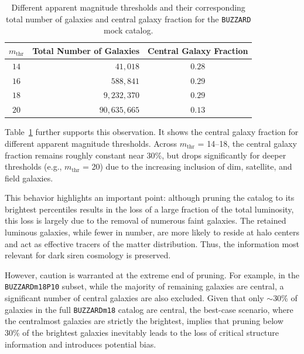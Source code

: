 \begin{table}
    \small
    \centering
    \caption[Central galaxy fraction for different $m_{\mathrm{thr}}$ for \texttt{BUZZARD}.]{Different apparent magnitude thresholds and their corresponding total number of galaxies and central galaxy fraction for the \texttt{BUZZARD} mock catalog.}
    \label{tab:MDC_catalogs}
    \begin{tabular}{c r c}
        \hline
        \textbf{$m_{\mathrm{thr}}$} & \textbf{Total Number of Galaxies} & \textbf{Central Galaxy Fraction} \\
        \hline
        $14$ & $41,018$ & $0.28$\\
        $16$ & $588,841$ & $0.29$ \\
        $18$ & $9,232,370$ & $0.29$ \\
        $20$ & $90,635,665$ & $0.13$ \\
        \hline
    \end{tabular}
\end{table}

Table~\ref{tab:MDC_catalogs} further supports this observation. It shows the central galaxy fraction for different apparent magnitude thresholds. Across $m_{\mathrm{thr}}$ = 14–18, the central galaxy fraction remains roughly constant near 30\%, but drops significantly for deeper thresholds (e.g., $m_{\mathrm{thr}}$ = 20) due to the increasing inclusion of dim, satellite, and field galaxies.

This behavior highlights an important point: although pruning the catalog to its brightest percentiles results in the loss of a large fraction of the total luminosity, this loss is largely due to the removal of numerous faint galaxies. The retained luminous galaxies, while fewer in number, are more likely to reside at halo centers and act as effective tracers of the matter distribution. Thus, the information most relevant for dark siren cosmology is preserved.

However, caution is warranted at the extreme end of pruning. For example, in the \texttt{BUZZARDm18P10} subset, while the majority of remaining galaxies are central, a significant number of central galaxies are also excluded. Given that only $\sim$30\% of galaxies in the full \texttt{BUZZARDm18} catalog are central, the best-case scenario, where the centralmost galaxies are strictly the brightest, implies that pruning below 30\% of the brightest galaxies inevitably leads to the loss of critical structure information and introduces potential bias.

